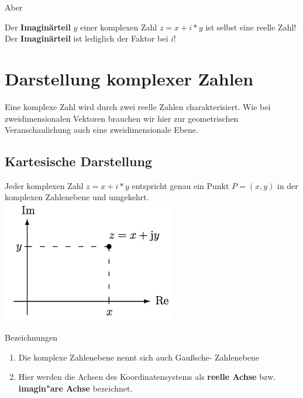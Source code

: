 	\begin{Bemerkung}
	Aber\\
	\end{Bemerkung}

	Der  \textbf{Imaginärteil} $y$ einer komplexen Zahl  $z =x+i*y$ ist selbst eine reelle Zahl! Der \textbf{Imaginärteil} ist lediglich der Faktor bei $i$!\\


\section{Darstellung komplexer Zahlen}

	Eine komplexe Zahl wird durch zwei reelle Zahlen charakterisiert. Wie bei zweidimensionalen Vektoren brauchen wir hier zur geometrischen Veranschaulichung auch eine zweidimensionale Ebene.\\

	\subsection{Kartesische Darstellung}

		Jeder komplexen Zahl $z =x+i*y$ entspricht genau ein Punkt $P =(x,y)$ in der komplexen Zahlenebene und umgekehrt.\\

		\includegraphics[width=3in]{kap6/komplexezahlen1}

		\begin{Bemerkung}
		Bezeichnungen\\
		\end{Bemerkung}

		\begin{enumerate}
		\item Die komplexe Zahlenebene nennt sich auch Gaußsche- Zahlenebene
		\item Hier werden die Achsen des Koordinatensystems als \textbf{reelle Achse} bzw. \textbf{imagin"are Achse} bezeichnet.\\
		\end{enumerate}

